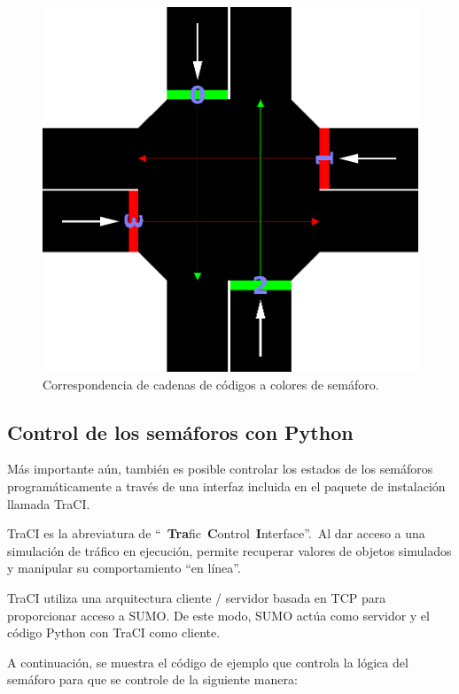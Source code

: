 \begin{figure}[H]
    \centering
\includegraphics[width=\textwidth]{sumo/tls_light_order.png}
    \caption{Correspondencia de cadenas de códigos a colores de semáforo.}
    \label{fig:netedit4}
\end{figure}

\hypertarget{control-de-los-semuxe1foros-con-python}{%
\subsection{Control de los semáforos con
Python}\label{control-de-los-semuxe1foros-con-python}}

Más importante aún, también es posible controlar los estados de los
semáforos programáticamente a través de una interfaz incluida en el
paquete de instalación llamada TraCI.

TraCI es la abreviatura de
``~\textbf{Tra}fic~\textbf{C}ontrol~\textbf{I}nterface''.~Al dar acceso
a una simulación de tráfico en ejecución, permite recuperar valores de
objetos simulados y manipular su comportamiento ``en línea''.

TraCI utiliza una arquitectura cliente / servidor basada en TCP para
proporcionar acceso a SUMO. De este modo, SUMO actúa como servidor y el
código Python con TraCI como cliente.

A continuación, se muestra el código de ejemplo que controla la lógica
del semáforo para que se controle de la siguiente manera:

